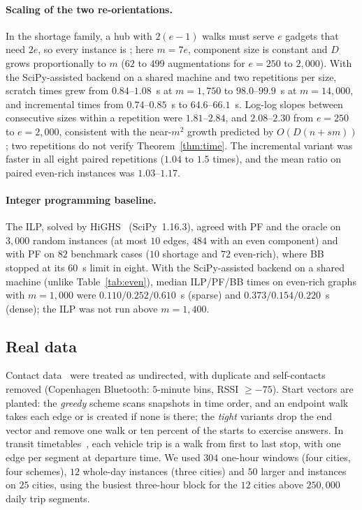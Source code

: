 \paragraph{Scaling of the two re-orientations.}
In the shortage family, a hub with $2(e-1)$ walks must serve $e$ gadgets that need $2e$, so every \FREE{} instance is \NO{}; here $m=7e$, component size is constant and $D$ grows proportionally to $m$ ($62$ to $499$ augmentations for $e=250$ to $2{,}000$). With the SciPy-assisted backend on a shared machine and two repetitions per size, scratch times grew from $0.84$--$1.08$~s at $m=1{,}750$ to $98.0$--$99.9$~s at $m=14{,}000$, and incremental times from $0.74$--$0.85$~s to $64.6$--$66.1$~s. Log-log slopes between consecutive sizes within a repetition were $1.81$--$2.84$, and $2.08$--$2.30$ from $e=250$ to $e=2{,}000$, consistent with the near-$m^2$ growth predicted by $O(D(n+sm))$; two repetitions do not verify Theorem~\ref{thm:time}. The incremental variant was faster in all eight paired repetitions ($1.04$ to $1.5$ times), and the mean ratio on paired even-rich instances was $1.03$--$1.17$.

\paragraph{Integer programming baseline.} The ILP, solved by HiGHS~\cite{huangfu2018} (SciPy~1.16.3), agreed with PF and the oracle on $3{,}000$ random instances (at most $10$ edges, $484$ with an even component) and with PF on $82$ benchmark cases ($10$ shortage and $72$ even-rich), where BB stopped at its $60$~s limit in eight. With the SciPy-assisted backend on a shared machine (unlike Table~\ref{tab:even}), median ILP/PF/BB times on even-rich graphs with $m=1{,}000$ were $0.110/0.252/0.610$~s (sparse) and $0.373/0.154/0.220$~s (dense); the ILP was not run above $m=1{,}400$.

\subsection{Real data}

Contact data~\cite{sapiezynski2019,stehle2011,fournet2014,mastrandrea2015,vanhems2013} were treated as undirected, with duplicate and self-contacts removed (Copenhagen Bluetooth: $5$-minute bins, RSSI $\ge-75$). Start vectors are planted: the \emph{greedy} scheme scans snapshots in time order, and an endpoint walk takes each edge or is created if none is there; the \emph{tight} variants drop the end vector and remove one walk or ten percent of the starts to exercise \NO{} answers. In transit timetables~\cite{kujala2018}, each vehicle trip is a walk from first to last stop, with one edge per segment at departure time. We used $304$ one-hour windows (four cities, four schemes), $12$ whole-day instances (three cities) and $50$ larger \FIX{} and \FREE{} instances on $25$ cities, using the busiest three-hour block for the $12$ cities above $250{,}000$ daily trip segments.

